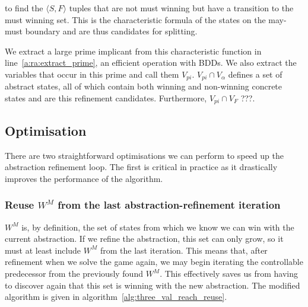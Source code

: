 \noindent to find the $\langle S, F \rangle$ tuples that are not must winning but have a transition to the must winning set. This is the characteristic formula of the states on the may-must boundary and are thus candidates for splitting.

We extract a large prime implicant from this characteristic function in line~\ref{a:ra:extract_prime}, an efficient operation with BDDs. We also extract the variables that occur in this prime and call them $V_{pi}$. $V_{pi} \cap V_{\alpha}$ defines a set of abstract states, all of which contain both winning and non-winning concrete states and are this refinement candidates. Furthermore, $V_{pi} \cap V_F$ ???.

\subsection{Optimisation}

There are two straightforward optimisations we can perform to speed up the abstraction refinement loop. The first is critical in practice as it drastically improves the performance of the algorithm.

\subsubsection{Reuse $W^M$ from the last abstraction-refinement iteration}

$W^M$ is, by definition, the set of states from which we know we can win with the current abstraction. If we refine the abstraction, this set can only grow, so it must at least include $W^M$ from the last iteration. This means that, after refinement when we solve the game again, we may begin iterating the controllable predecessor from the previously found $W^M$. This effectively saves us from having to discover again that this set is winning with the new abstraction. The modified algorithm is given in algorithm~\ref{alg:three_val_reach_reuse}.

